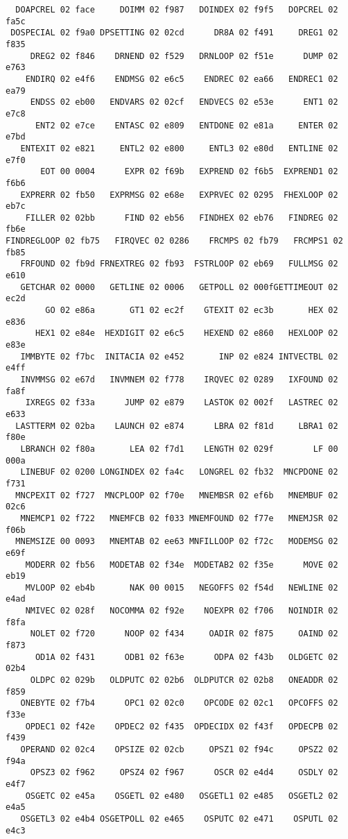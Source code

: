 {\begin{verbatim}
  DOAPCREL 02 face     DOIMM 02 f987   DOINDEX 02 f9f5   DOPCREL 02 fa5c
 DOSPECIAL 02 f9a0 DPSETTING 02 02cd      DR8A 02 f491     DREG1 02 f835
     DREG2 02 f846    DRNEND 02 f529   DRNLOOP 02 f51e      DUMP 02 e763
    ENDIRQ 02 e4f6    ENDMSG 02 e6c5    ENDREC 02 ea66   ENDREC1 02 ea79
     ENDSS 02 eb00   ENDVARS 02 02cf   ENDVECS 02 e53e      ENT1 02 e7c8
      ENT2 02 e7ce    ENTASC 02 e809   ENTDONE 02 e81a     ENTER 02 e7bd
   ENTEXIT 02 e821     ENTL2 02 e800     ENTL3 02 e80d   ENTLINE 02 e7f0
       EOT 00 0004      EXPR 02 f69b   EXPREND 02 f6b5  EXPREND1 02 f6b6
   EXPRERR 02 fb50   EXPRMSG 02 e68e   EXPRVEC 02 0295  FHEXLOOP 02 eb7c
    FILLER 02 02bb      FIND 02 eb56   FINDHEX 02 eb76   FINDREG 02 fb6e
FINDREGLOOP 02 fb75   FIRQVEC 02 0286    FRCMPS 02 fb79   FRCMPS1 02 fb85
   FRFOUND 02 fb9d FRNEXTREG 02 fb93  FSTRLOOP 02 eb69   FULLMSG 02 e610
   GETCHAR 02 0000   GETLINE 02 0006   GETPOLL 02 000fGETTIMEOUT 02 ec2d
        GO 02 e86a       GT1 02 ec2f    GTEXIT 02 ec3b       HEX 02 e836
      HEX1 02 e84e  HEXDIGIT 02 e6c5    HEXEND 02 e860   HEXLOOP 02 e83e
   IMMBYTE 02 f7bc  INITACIA 02 e452       INP 02 e824 INTVECTBL 02 e4ff
   INVMMSG 02 e67d   INVMNEM 02 f778    IRQVEC 02 0289   IXFOUND 02 fa8f
    IXREGS 02 f33a      JUMP 02 e879    LASTOK 02 002f   LASTREC 02 e633
  LASTTERM 02 02ba    LAUNCH 02 e874      LBRA 02 f81d     LBRA1 02 f80e
   LBRANCH 02 f80a       LEA 02 f7d1    LENGTH 02 029f        LF 00 000a
   LINEBUF 02 0200 LONGINDEX 02 fa4c   LONGREL 02 fb32  MNCPDONE 02 f731
  MNCPEXIT 02 f727  MNCPLOOP 02 f70e   MNEMBSR 02 ef6b   MNEMBUF 02 02c6
   MNEMCP1 02 f722   MNEMFCB 02 f033 MNEMFOUND 02 f77e   MNEMJSR 02 f06b
  MNEMSIZE 00 0093   MNEMTAB 02 ee63 MNFILLOOP 02 f72c   MODEMSG 02 e69f
    MODERR 02 fb56   MODETAB 02 f34e  MODETAB2 02 f35e      MOVE 02 eb19
    MVLOOP 02 eb4b       NAK 00 0015   NEGOFFS 02 f54d   NEWLINE 02 e4ad
    NMIVEC 02 028f   NOCOMMA 02 f92e    NOEXPR 02 f706   NOINDIR 02 f8fa
     NOLET 02 f720      NOOP 02 f434     OADIR 02 f875     OAIND 02 f873
      OD1A 02 f431      ODB1 02 f63e      ODPA 02 f43b   OLDGETC 02 02b4
     OLDPC 02 029b   OLDPUTC 02 02b6  OLDPUTCR 02 02b8   ONEADDR 02 f859
   ONEBYTE 02 f7b4      OPC1 02 02c0    OPCODE 02 02c1   OPCOFFS 02 f33e
    OPDEC1 02 f42e    OPDEC2 02 f435  OPDECIDX 02 f43f   OPDECPB 02 f439
   OPERAND 02 02c4    OPSIZE 02 02cb     OPSZ1 02 f94c     OPSZ2 02 f94a
     OPSZ3 02 f962     OPSZ4 02 f967      OSCR 02 e4d4     OSDLY 02 e4f7
    OSGETC 02 e45a    OSGETL 02 e480   OSGETL1 02 e485   OSGETL2 02 e4a5
   OSGETL3 02 e4b4 OSGETPOLL 02 e465    OSPUTC 02 e471    OSPUTL 02 e4c3

\end{verbatim}}
